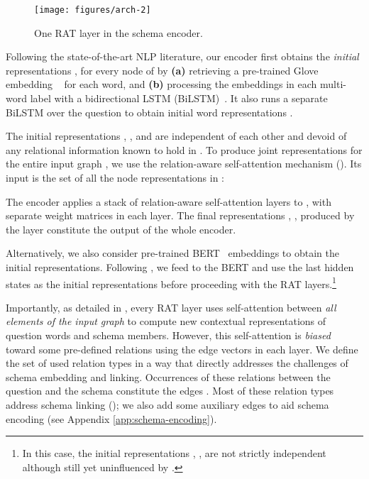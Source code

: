 \documentclass[11pt,a4paper,final]{article}
\begin{document}
\begin{figure}
    \centering
    \texttt{[image: figures/arch-2]}
    \caption{One RAT layer in the schema encoder.}
    \label{fig:rel-attn}
    \vspace{-1\baselineskip}
\end{figure}

Following the state-of-the-art NLP literature, our encoder first obtains the \emph{initial}
representations , 
for every node of  by
\textbf{(a)} retrieving a pre-trained Glove embedding ~\citep{pennington2014glove} for each word, and
\textbf{(b)} processing the embeddings in each multi-word label with a bidirectional LSTM (\mbox{BiLSTM})~\citep{lstm}.
It also runs a separate BiLSTM over the question  to obtain initial word representations
.


The initial representations , , and 
are independent of each other and devoid of any relational information known to hold in .
To produce joint representations for the entire input graph , we use the relation-aware self-attention
mechanism ().
Its input  is the set of all the node representations in :

The encoder  applies a stack of  relation-aware self-attention layers to ,
with separate weight matrices in each layer.
The final representations , ,  produced by the  layer
constitute the output of the whole encoder.

Alternatively, we also consider pre-trained BERT~\citep{bert} embeddings to obtain the initial representations.
Following \cite{huangMusicTransformer2018,EditSQL2019}, we feed  to the BERT and use the last hidden states as the initial representations before proceeding with the RAT layers.\footnote{In this case, the initial representations , ,  are not strictly independent although still yet uninfluenced by .}

Importantly, as detailed in , every RAT layer uses self-attention between \emph{all elements of the input
graph } to compute new contextual representations of question words and schema members.
However, this self-attention is \emph{biased} toward some pre-defined relations using the edge vectors
 in each layer.
We define the set of used relation types in a way that directly addresses the challenges of schema embedding and
linking.
Occurrences of these relations between the question and the schema constitute the edges .
Most of these relation types address schema linking ();
we also add some auxiliary edges to aid schema encoding
(see Appendix \ref{app:schema-encoding}).
\end{document}
